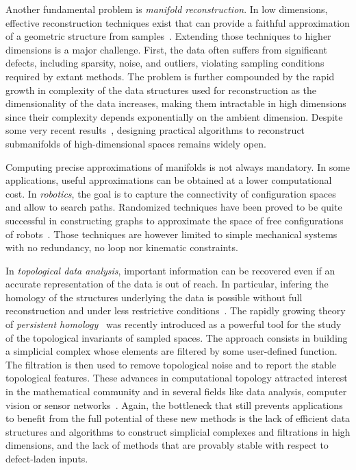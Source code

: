 Another fundamental problem is {\em manifold reconstruction}.  In low dimensions, effective reconstruction techniques exist that can provide a faithful approximation of a geometric structure from samples~\cite{dey-csr-2007}. %
Extending those techniques to higher dimensions is a major challenge.  First, the data often suffers from significant defects, including sparsity, noise, and outliers, violating sampling conditions required by extant methods. The problem is further compounded by the rapid growth in complexity of the data structures used for reconstruction as the dimensionality of the data increases, making them intractable in high dimensions since their complexity depends exponentially on the ambient dimension. Despite some very recent results~\cite{geometrica-7142i}, designing practical algorithms to reconstruct submanifolds of high-dimensional spaces remains widely open.

Computing precise approximations of manifolds is not always mandatory. In some applications,   useful approximations can be obtained at a lower computational cost.
In {\em robotics}, the goal is to capture the connectivity of configuration spaces and allow to search paths. Randomized techniques have been proved to be quite successful in constructing graphs to approximate the space of free configurations of robots~\cite{sml-pa-2006}. Those techniques are however limited to simple mechanical systems with no redundancy, no loop nor kinematic constraints. 

In {\em topological data analysis}, important information can be recovered even if an accurate representation of the data is out of reach. In particular, infering the homology of the structures underlying the data is possible without full reconstruction and under less restrictive conditions~\cite{geometrica-ccl09,nsw-fhm-2008}. The rapidly growing theory of {\em persistent homology}~\cite{eh-ph-2008,rg-bptd-2008} was recently introduced as a powerful tool for the study of the topological invariants of sampled spaces. The approach consists in building a simplicial complex whose elements are filtered by some user-defined function. The filtration is then used to remove topological noise and to report the stable topological features.  These advances in computational topology attracted interest in the mathematical community and in several fields like data analysis, computer vision or sensor networks~\cite{rg-bptd-2008}. Again, the bottleneck that still prevents applications to benefit from the full potential of these new methods is the lack of efficient data structures and algorithms to construct simplicial complexes and filtrations in high dimensions, and the lack of methods that are provably stable with respect to  defect-laden inputs.


